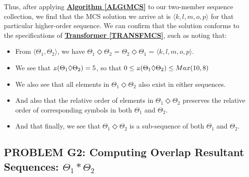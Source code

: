 \documentclass[a4paper, 18pt]{article} %
\newcommand{\invpi}{\rotatebox[origin=c]{180}{$\pi$}}
\begin{document}
\vspace{2em}

Thus, after applying  \textbf{\hyperref[ALGtMCS]{Algorithm \ref{ALGtMCS}}} to our two-member sequence collection, we find that the MCS solution we arrive at is $\langle k, l, m, o, p\rangle$ for that particular higher-order sequence. We can confirm that the solution conforms to the specifications of \textbf{\hyperref[TRANSFMCS]{Transformer \ref{TRANSFMCS}}}, such as noting that:

\begin{itemize}
\item From $\langle \Theta_1, \Theta_2 \rangle$, we have $\Theta_1 \Diamond \Theta_2$ = $\Theta_2 \Diamond \Theta_1$ =  $\langle k, l, m, o, p\rangle$.
\item We see that $\invpi(\Theta_1 \Diamond \Theta_2) = 5$, so that $ 0 \leq \invpi(\Theta_1 \Diamond \Theta_2) \leq Max(10, 8)$
\item We also see that all elements in $\Theta_1 \Diamond \Theta_2$ also exist in either sequences.
\item And also that the relative order of elements in $\Theta_1 \Diamond \Theta_2$ preserves the relative order of corresponding symbols in both $\Theta_1$ and $\Theta_2$.
\item And that finally, we see that $\Theta_1 \Diamond \Theta_2$ is a sub-sequence of both $\Theta_1$ and $\Theta_2$.
\end{itemize}





\subsection{PROBLEM G2: Computing Overlap Resultant Sequences: $\Theta_1 \ast \Theta_2$}
\label{PROBG2}
\end{document}

